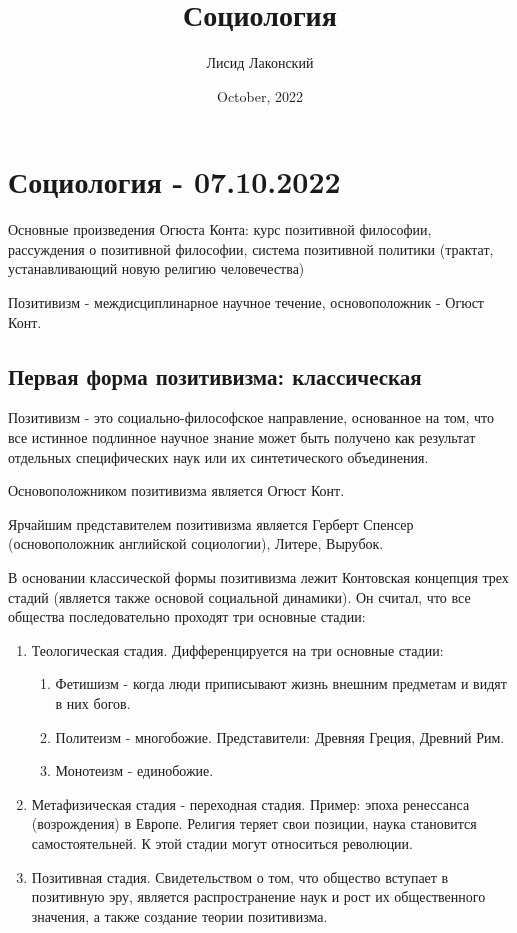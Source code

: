 \documentclass{article}
\title{Социология}
\author{Лисид Лаконский}
\date{October, 2022}
\begin{document}
\maketitle
\tableofcontents
\pagebreak

\section{Социология - 07.10.2022}

Основные произведения Огюста Конта: курс позитивной философии, рассуждения о позитивной философии, система позитивной политики (трактат, устанавливающий новую религию человечества)

Позитивизм - междисциплинарное научное течение, основоположник - Огюст Конт.

\subsection{Первая форма позитивизма: классическая}

Позитивизм - это социально-философское направление, основанное на том, что все истинное подлинное научное знание может быть получено как результат отдельных специфических наук или их синтетического объединения.

Основоположником позитивизма является Огюст Конт.

Ярчайшим представителем позитивизма является Герберт Спенсер (основоположник английской социологии), Литере, Вырубок.

В основании классической формы позитивизма лежит Контовская концепция трех стадий (является также основой социальной динамики). Он считал, что все общества последовательно проходят три основные стадии:

\begin{enumerate}
    \item Теологическая стадия. Дифференцируется на три основные стадии:
    \begin{enumerate}
        \item Фетишизм - когда люди приписывают жизнь внешним предметам и видят в них богов.
        \item Политеизм - многобожие. Представители: Древняя Греция, Древний Рим.
        \item Монотеизм - единобожие.
    \end{enumerate}
    \item Метафизическая стадия - переходная стадия. Пример: эпоха ренессанса (возрождения) в Европе. Религия теряет свои позиции, наука становится самостоятельней. К этой стадии могут относиться революции.
    \item Позитивная стадия. Свидетельством о том, что общество вступает в позитивную эру, является распространение наук и рост их общественного значения, а также создание теории позитивизма.
\end{enumerate}
\end{document}
